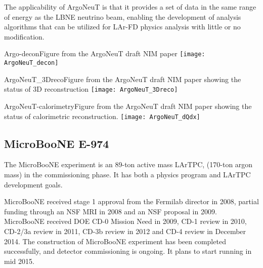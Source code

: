 The applicability of ArgoNeuT is that it provides a set of data in the same range of energy as the LBNE neutrino beam, enabling the development of analysis algorithms that can be utilized for LAr-FD physics analysis with little or no modification.


\begin{cdrfigure}{Argo-decon}{Figure from the ArgoNeuT draft NIM paper}
\texttt{[image: ArgoNeuT\_decon]}
\end{cdrfigure} %

\begin{cdrfigure}{ArgoNeuT_3Dreco}{Figure from the ArgoNeuT draft NIM paper showing the status of 3D reconstruction}
\texttt{[image: ArgoNeuT\_3Dreco]}
\end{cdrfigure}%

\begin{cdrfigure}{ArgoNeuT-calorimetry}{Figure from the ArgoNeuT draft NIM paper showing the status of calorimetric reconstruction.}
\texttt{[image: ArgoNeuT\_dQdx]}
\end{cdrfigure}%

\subsection {MicroBooNE E-974}

The MicroBooNE experiment is an 89-ton active mass LArTPC, (170-ton argon mass) in the commissioning phase.  It has both a physics program and LArTPC development goals.  

MicroBooNE received stage 1 approval from the Fermilab director in 2008, partial funding through an NSF MRI in 2008 and an NSF proposal in 2009.  MicroBooNE received DOE CD-0 Mission Need in 2009, CD-1 review in 2010, CD-2/3a review in 2011, CD-3b review in 2012 and CD-4 review in December 2014. The construction of MicroBooNE experiment has been completed successfully, and detector commissioning is ongoing. It plans to start running in mid 2015. 

